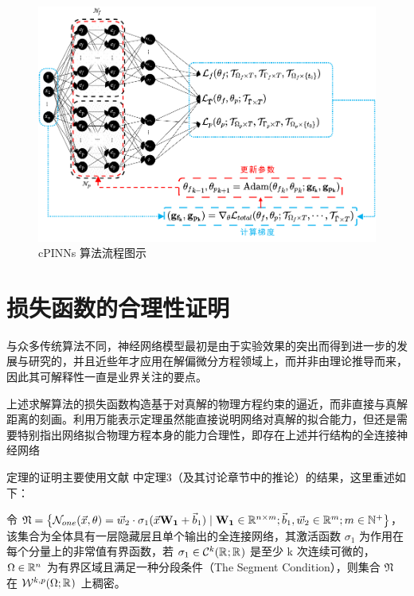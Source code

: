 \begin{figure}[t]
    \centering
    \includegraphics[width=1.0\linewidth]{images/算法2图示.pdf}
    \caption{ cPINNs 算法流程图示 }
    \label{fig:cPINNs}
\end{figure}

\section{损失函数的合理性证明}

与众多传统算法不同，神经网络模型最初是由于实验效果的突出而得到进一步的发展与研究的，并且近些年才应用在解偏微分方程领域上，而并非由理论推导而来，因此其可解释性一直是业界关注的要点。

上述求解算法的损失函数构造基于对真解的物理方程约束的逼近，而非直接与真解距离的刻画。利用万能表示定理虽然能直接说明网络对真解的拟合能力，但还是需要特别指出网络拟合物理方程本身的能力合理性，即存在上述并行结构的全连接神经网络

\newcommand{\NNset}{\mathfrak{N}}
定理的证明主要使用文献 \cite{hornik1991approximation} 中定理3（及其讨论章节中的推论）的结果，这里重述如下：

\begin{theorem}\label{thm:approximation}
令 $\NNset = \bigl\{\NN_{one}(\vec{x},\params) = \vec{w}_2 \cdot \sigma_1(\vec{x}\matfmt{W_1} + \vec{b}_1) \mid \matfmt{W_1} \in \R[n \times m]; \vec{b}_1,\vec{w}_2 \in \R[m]; m \in \N[+] \bigr\}$，该集合为全体具有一层隐藏层且单个输出的全连接网络，其激活函数 $\sigma_1$ 为作用在每个分量上的非常值有界函数，若 $\sigma_1 \in \C[k](\R;\R)$ 是至少 k 次连续可微的， $\Omega \in \R[n]$ 为有界区域且满足一种分段条件（The Segment Condition）\cite{adams2003sobolev}，则集合 $\NNset$ 在 $\Wkp{k}(\Omega; \R)$ 上稠密。
\end{theorem}

